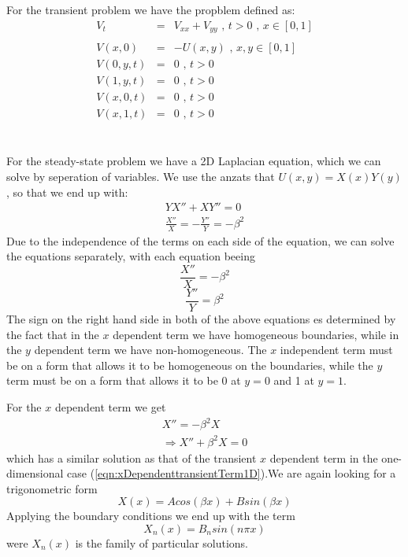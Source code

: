 \documentclass{article}
\begin{document}
For the transient problem we have the propblem defined as:
\begin{subequations}
\begin{eqnarray}
\label{eqn:transientPDE}
V_t &=& V_{xx} + V_{yy} \textit{ , } t>0 \textit{ , } x \in [0,1] \\ \nonumber
\\
\label{eqn:transientICPDE}
V(x,0) &=& -U(x,y) \textit{ , } x,y \in [0,1] \\
V(0,y,t) &=& 0 \textit{ , } t>0 \\
V(1,y,t) &=& 0 \textit{ , } t>0 \\
V(x,0,t) &=& 0 \textit{ , } t>0 \\
V(x,1,t) &=& 0 \textit{ , } t>0 
\end{eqnarray}
\end{subequations}
\\\\
For the steady-state problem we have a 2D Laplacian equation, which we can solve by seperation of variables. We use the anzats that $U(x,y) = X(x)Y(y)$, so that we end up with:
\begin{eqnarray}
\nonumber
YX'' + XY''=0 \\ \nonumber
\frac{X''}{X} = - \frac{Y''}{Y} = -\beta^2
\end{eqnarray}
Due to the independence of the terms on each side of the equation, we can solve the equations separately, with each equation beeing
\begin{equation}
\frac{X''}{X} = -\beta^2 \nonumber
\end{equation}
\begin{equation}
\frac{Y''}{Y} = \beta^2 \nonumber
\end{equation}
The sign on the right hand side in both of the above equations es determined by the fact that in the $x$ dependent term we have homogeneous boundaries, while in the $y$ dependent term we have non-homogeneous. The $x$ independent term must be on a form that allows it to be homogeneous on the boundaries, while the $y$ term must be on a form that allows it to be 0 at $y=0$ and 1 at $y=1$. 

For the $x$ dependent term we get
\begin{eqnarray}
\nonumber
X'' = -\beta^2 X \\ \nonumber
\Rightarrow X'' + \beta^2 X = 0 
\end{eqnarray}
which has a similar solution as that of the transient $x$ dependent term in the one-dimensional case (\ref{eqn:xDependenttransientTerm1D}).We are again looking for a trigonometric form
\begin{equation}
X(x) = Acos(\beta x) + Bsin(\beta x) \nonumber
\end{equation}
Applying the boundary conditions we end up with the term
\begin{equation}
X_n(x) = B_nsin(n\pi x)
\label{eqn:xDependenSteadyState2D}
\end{equation}
were ${X_n(x)}$ is the family of particular solutions.\\
\\
\end{document}
